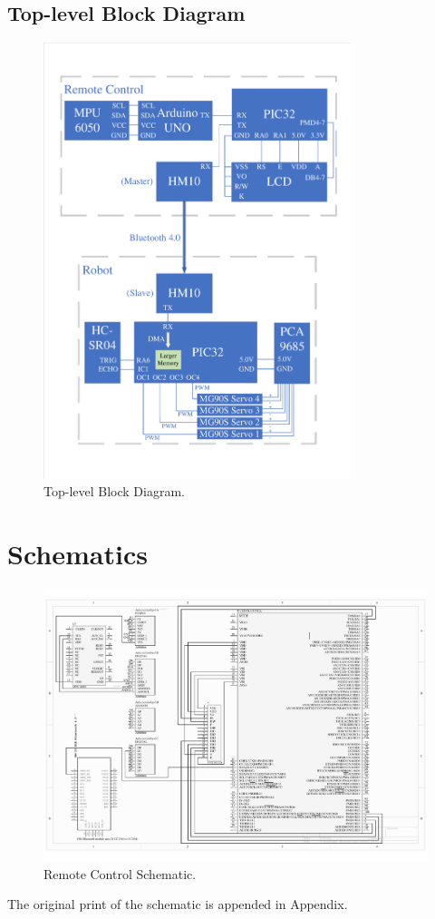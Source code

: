 \documentclass[a4paper]{article}
\begin{document}
\subsection{Top-level Block Diagram}
\begin{figure}[H]
    \centering
    \includegraphics[width=0.8\textwidth]{Diagram.pdf}
    \caption{Top-level Block Diagram.}
\end{figure}
\section{Schematics}
\begin{figure}[H]
    \centering
    \includegraphics[width=1\textwidth]{Remote Control Schematic.pdf}
    \caption{Remote Control Schematic\protect\footnotemark[1].}
\end{figure}
The original print of the schematic is appended in Appendix.
\end{document}
